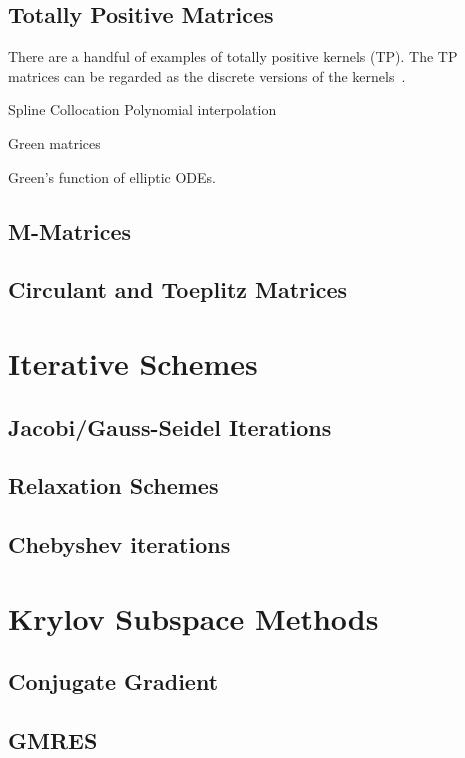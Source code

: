 \subsection{Totally Positive Matrices} 
    There are a handful of examples of totally positive kernels (TP). The TP matrices can be regarded as the discrete versions of the kernels~\cite{karlin1970total}. 
    \begin{example}
        Spline Collocation
Polynomial interpolation
    \end{example}
    \begin{example}
        Green matrices
    \end{example}
\begin{example}
    Green's function of elliptic ODEs. 
\end{example}
\subsection{M-Matrices}
\subsection{Circulant and Toeplitz Matrices}

\section{Iterative Schemes}
\subsection{Jacobi/Gauss-Seidel Iterations}
\subsection{Relaxation Schemes}
\subsection{Chebyshev iterations}
\newpage
\section{Krylov Subspace Methods}
\subsection{Conjugate Gradient}
\subsection{GMRES}

